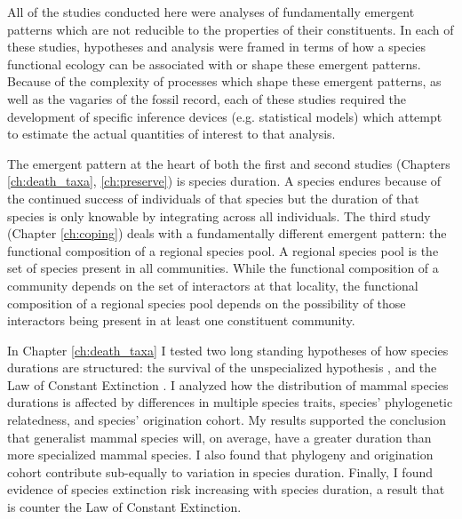 All of the studies conducted here were analyses of fundamentally emergent patterns which are not reducible to the properties of their constituents. In each of these studies, hypotheses and analysis were framed in terms of how a species functional ecology can be associated with or shape these emergent patterns. Because of the complexity of processes which shape these emergent patterns, as well as the vagaries of the fossil record, each of these studies required the development of specific inference devices (e.g. statistical models) which attempt to estimate the actual quantities of interest to that analysis. 

The emergent pattern at the heart of both the first and second studies (Chapters \ref{ch:death_taxa}, \ref{ch:preserve}) is species duration. A species endures because of the continued success of individuals of that species but the duration of that species is only knowable by integrating across all individuals. The third study (Chapter \ref{ch:coping}) deals with a fundamentally different emergent pattern: the functional composition of a regional species pool. A regional species pool is the set of species present in all communities. While the functional composition of a community depends on the set of interactors at that locality, the functional composition of a regional species pool depends on the possibility of those interactors being present in at least one constituent community.

In Chapter \ref{ch:death_taxa} I tested two long standing hypotheses of how species durations are structured: the survival of the unspecialized hypothesis \citep{Simpson1944}, and the Law of Constant Extinction \citep{VanValen1973}. I analyzed how the distribution of mammal species durations is affected by differences in multiple species traits, species' phylogenetic relatedness, and species' origination cohort. My results supported the conclusion that generalist mammal species will, on average, have a greater duration than more specialized mammal species. I also found that phylogeny and origination cohort contribute sub-equally to variation in species duration. Finally, I found evidence of species extinction risk increasing with species duration, a result that is counter the Law of Constant Extinction.


